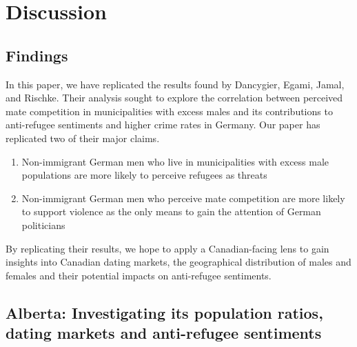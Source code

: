 \documentclass[
]{article}
\begin{document}
\hypertarget{discussion}{%
\section{Discussion}\label{discussion}}

\hypertarget{findings}{%
\subsection{Findings}\label{findings}}

In this paper, we have replicated the results found by Dancygier, Egami,
Jamal, and Rischke. Their analysis sought to explore the correlation
between perceived mate competition in municipalities with excess males
and its contributions to anti-refugee sentiments and higher crime rates
in Germany. Our paper has replicated two of their major claims.

\begin{enumerate}
\def\labelenumi{(\arabic{enumi})}
\item
  Non-immigrant German men who live in municipalities with excess male
  populations are more likely to perceive refugees as threats~
\item
  Non-immigrant German men who perceive mate competition are more likely
  to support violence as the only means to gain the attention of German
  politicians
\end{enumerate}

By replicating their results, we hope to apply a Canadian-facing lens to
gain insights into Canadian dating markets, the geographical
distribution of males and females and their potential impacts on
anti-refugee sentiments.~

\hypertarget{alberta-investigating-its-population-ratios-dating-markets-and-anti-refugee-sentiments}{%
\subsection{Alberta: Investigating its population ratios, dating markets
and anti-refugee
sentiments}\label{alberta-investigating-its-population-ratios-dating-markets-and-anti-refugee-sentiments}}
\end{document}
